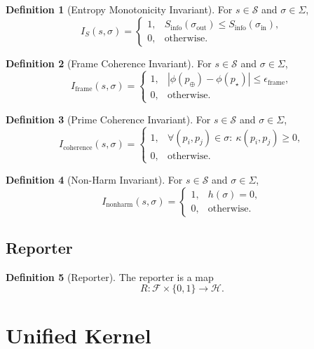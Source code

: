\documentclass[12pt]{article}
\theoremstyle{definition}
\newtheorem{definition}{Definition}[section]
\theoremstyle{plain}
\begin{document}
\begin{definition}[Entropy Monotonicity Invariant]
For \(s \in \mathcal{S}\) and \(\sigma \in \Sigma\),
\[
I_{S}(s,\sigma) =
\begin{cases}
1, & S_{\mathrm{info}}(\sigma_{\mathrm{out}})
    \le S_{\mathrm{info}}(\sigma_{\mathrm{in}}),\\
0, & \text{otherwise}.
\end{cases}
\]
\end{definition}

\begin{definition}[Frame Coherence Invariant]
For \(s \in \mathcal{S}\) and \(\sigma \in \Sigma\),
\[
I_{\mathrm{frame}}(s,\sigma) =
\begin{cases}
1, & |\phi(p_{\oplus}) - \phi(p_{\star})|
      \le \epsilon_{\mathrm{frame}},\\
0, & \text{otherwise}.
\end{cases}
\]
\end{definition}

\begin{definition}[Prime Coherence Invariant]
For \(s \in \mathcal{S}\) and \(\sigma \in \Sigma\),
\[
I_{\mathrm{coherence}}(s,\sigma) =
\begin{cases}
1, & \forall (p_i,p_j)\in\sigma:\ \kappa(p_i,p_j)\ge 0,\\
0, & \text{otherwise}.
\end{cases}
\]
\end{definition}

\begin{definition}[Non-Harm Invariant]
For \(s \in \mathcal{S}\) and \(\sigma \in \Sigma\),
\[
I_{\mathrm{nonharm}}(s,\sigma) =
\begin{cases}
1, & h(\sigma)=0,\\
0, & \text{otherwise}.
\end{cases}
\]
\end{definition}

\subsection{Reporter}

\begin{definition}[Reporter]
The reporter is a map
\[
R : \mathcal{F} \times \{0,1\} \to \mathcal{H}.
\]
\end{definition}

\section{Unified Kernel}
\end{document}
